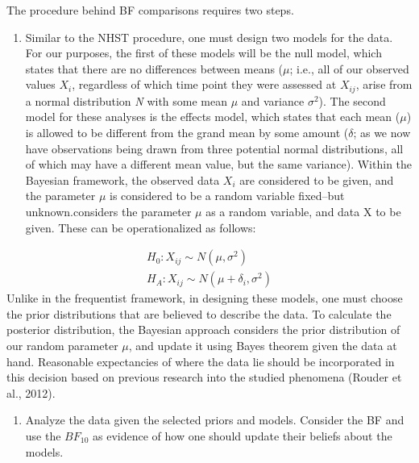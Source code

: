 \documentclass[,man, mask]{apa6}
\providecommand{\tightlist}{%
  \setlength{\itemsep}{0pt}\setlength{\parskip}{0pt}}
\theoremstyle{definition}
\theoremstyle{definition}
\theoremstyle{definition}
\theoremstyle{remark}
\begin{document}
The procedure behind BF comparisons requires two steps.

\begin{enumerate}
\def\labelenumi{\arabic{enumi})}
\tightlist
\item
  Similar to the NHST procedure, one must design two models for the
  data. For our purposes, the first of these models will be the null
  model, which states that there are no differences between means
  (\(\mu\); i.e., all of our observed values \(X_{i}\), regardless of
  which time point they were assessed at \(X_{ij}\), arise from a normal
  distribution \emph{N} with some mean \(\mu\) and variance
  \(\sigma^2\)). The second model for these analyses is the effects
  model, which states that each mean (\(\mu\)) is allowed to be
  different from the grand mean by some amount (\(\delta\); as we now
  have observations being drawn from three potential normal
  distributions, all of which may have a different mean value, but the
  same variance). Within the Bayesian framework, the observed data
  \(X_{i}\) are considered to be given, and the parameter \(\mu\) is
  considered to be a random variable fixed--but unknown.considers the
  parameter \(\mu\) as a random variable, and data X to be given. These
  can be operationalized as follows:
\end{enumerate}

\[
\begin{aligned}
  H_0: X_{ij} \sim N(\mu, \sigma^2) \\
  H_A: X_{ij} \sim N(\mu + \delta_i, \sigma^2)
\end{aligned}
\] Unlike in the frequentist framework, in designing these models, one
must choose the prior distributions that are believed to describe the
data. To calculate the posterior distribution, the Bayesian approach
considers the prior distribution of our random parameter \(\mu\), and
update it using Bayes theorem given the data at hand. Reasonable
expectancies of where the data lie should be incorporated in this
decision based on previous research into the studied phenomena (Rouder
et al., 2012).

\begin{enumerate}
\def\labelenumi{\arabic{enumi})}
\setcounter{enumi}{1}
\tightlist
\item
  Analyze the data given the selected priors and models. Consider the BF
  and use the \(BF_{10}\) as evidence of how one should update their
  beliefs about the models.
\end{enumerate}
\end{document}
